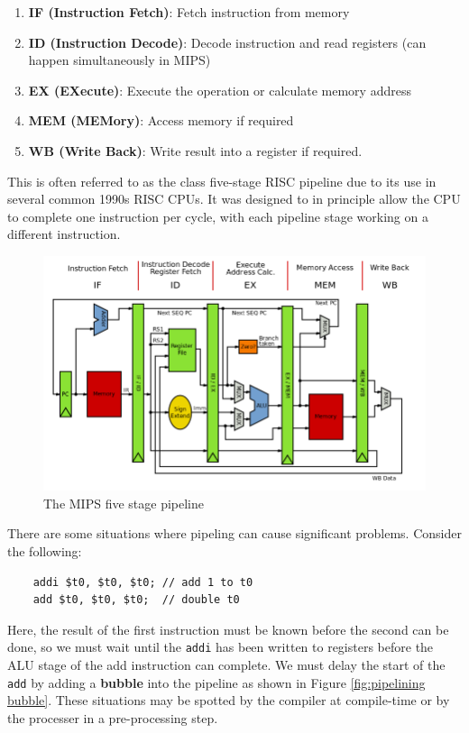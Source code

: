 \documentclass{article}
\begin{document}
	\begin{enumerate}
		\item \textbf{IF (Instruction Fetch)}: Fetch instruction from memory
		\item \textbf{ID (Instruction Decode)}: Decode instruction and read registers (can happen simultaneously in MIPS)
		\item \textbf{EX (EXecute)}: Execute the operation or calculate memory address
		\item \textbf{MEM (MEMory)}: Access memory if required
		\item \textbf{WB (Write Back)}: Write result into a register if required.
	\end{enumerate}	
	
	This is often referred to as the class five-stage RISC pipeline due to its use in several common 1990s RISC CPUs. It was designed to in principle allow the CPU to complete one instruction per cycle, with each pipeline stage working on a different instruction.
	
	\begin{figure}[ht]
		\centering
		\includegraphics[width=\textwidth]{mips_five_stage_pipeline}
		\caption{The MIPS five stage pipeline}
		\label{fig:mips five stage pipeline}
	\end{figure}
	
	\par There are some situations where pipeling can cause significant problems. Consider the following:
	
	\begin{verbatim}
	addi $t0, $t0, $t0; // add 1 to t0
	add $t0, $t0, $t0;  // double t0
	\end{verbatim}	
	
	Here, the result of the first instruction must be known before the second can be done, so we must wait until the \texttt{addi} has been written to registers before the ALU stage of the add instruction can complete. We must delay the start of the \texttt{add} by adding a \textbf{bubble} into the pipeline as shown in Figure \ref{fig:pipelining bubble}. These situations may be spotted by the compiler at compile-time or by the processer in a pre-processing step.
	
\end{document}
